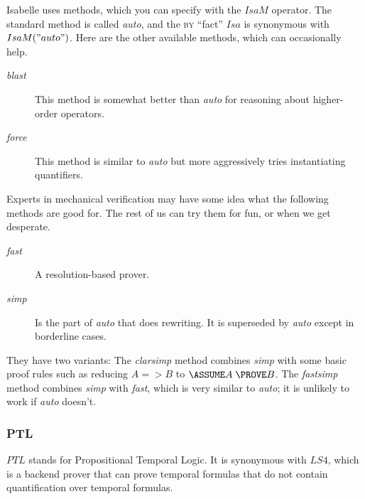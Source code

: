 \documentclass[fleqn,leqno]{article}
\begin{document}
Isabelle uses methods, which you can specify with the
$IsaM$ operator.  The standard method is called \emph{auto}, 
and the
\textsc{by} ``fact'' $Isa$ is synonymous with $IsaM("auto")$.  Here
are the other available methods, which can occasionally help.
\begin{description}
\item[\emph{blast}] 
This method 
is somewhat better than \emph{auto} for reasoning
about higher-order operators.

\item[\emph{force}]
This 
method is similar to \emph{auto} but more aggressively
tries instantiating quantifiers.
\end{description}
Experts in mechanical verification may have some idea what the
following methods are good for.  The rest of us can try them for fun,
or when we get desperate.
\begin{description}
\item[\emph{fast}] A 
resolution-based prover.  

\item[\emph{simp}] Is the part of \emph{auto} that does
rewriting.  It is superseded by \emph{auto}
except in borderline cases.
\end{description}
They have two variants: The 
\emph{clarsimp} method combines \emph{simp} with some basic
proof rules such as reducing $A => B$ to 
$\ASSUME A\; \PROVE B$.  The
\emph{fastsimp} method combines \emph{simp} with \emph{fast},
which is very similar to \emph{auto}; it is unlikely to work
if \emph{auto} doesn't.


\vspace{-\baselineskip}%
%
\subsubsection*{PTL}

$PTL$ stands for Propositional Temporal Logic.  It is synonymous with
$LS4$, which is a backend prover that can prove temporal formulas that
do not contain quantification over temporal formulas.  
\end{document}
